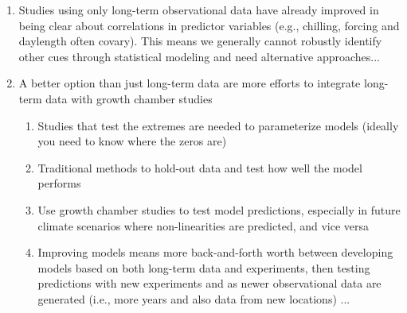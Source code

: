 \documentclass[11pt,letterpaper]{article}
\begin{document}
\begin{enumerate}
\begin{enumerate}
\begin{enumerate}
\item Studies using only long-term observational data have already improved in being clear about correlations in predictor variables (e.g., chilling, forcing and daylength often covary). This means we generally cannot robustly identify other cues through statistical modeling and need alternative approaches... %
\item A better option than just long-term data are more efforts to integrate long-term data with growth chamber studies \citep{Caffarra:2011qf,nagano2012,satake2013,ford2016,chuinearees} %
\begin{enumerate}
\item Studies that test the extremes are needed to parameterize models (ideally you need to know where the zeros are) \citep{chuinearees} %
\item Traditional methods to hold-out data and test how well the model performs
\item Use growth chamber studies to test model predictions, especially in future climate scenarios where non-linearities are predicted, and vice versa \citep[see][]{nagano2012}
\item Improving models means more back-and-forth worth between developing models based on both long-term data and experiments, then testing predictions with new experiments and as newer observational data are generated (i.e., more years and also data from new locations) ... \citep{nagano2012,satake2013}

\end{enumerate}
\end{enumerate}
\end{enumerate}
\end{enumerate}
\end{document}

